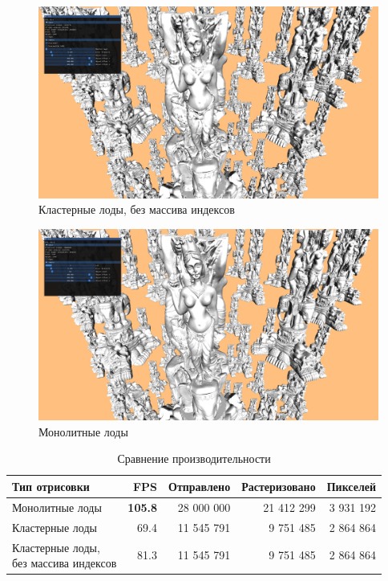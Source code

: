 \begin{figure}[h]
    \centering
    \includegraphics[width=\textwidth]{impl2.png}
    \caption{Кластерные лоды, без массива индексов}
    \label{fig:impl-cluster-2}
\end{figure}

\begin{figure}[h]
    \centering
    \includegraphics[width=\textwidth]{impl3.png}
    \caption{Монолитные лоды}
    \label{fig:impl-mono}
\end{figure}

\begin{table}[h]
    \centering
    \begin{tabular}{lrrrr}
        \hline \hline
        Тип отрисовки
        & FPS
        & Отправлено
        & Растеризовано
        & Пикселей \\ \hline
        Монолитные лоды
        & \textbf{105.8}
        & 28 000 000
        & 21 412 299
        & 3 931 192 \\
        Кластерные лоды
        & 69.4
        & 11 545 791
        & 9 751 485
        & 2 864 864 \\
        \makecell[l]{Кластерные лоды,\\ без массива индексов} & 81.3
        & 11 545 791
        & 9 751 485
        & 2 864 864 \\
        \hline \hline
    \end{tabular}

    \caption{Сравнение производительности}
    \label{tab:fps}
\end{table}
